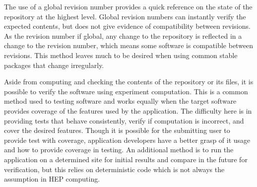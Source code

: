 \documentclass[conference]{IEEEtran}
\begin{document}
The use of a global revision number provides a quick reference
on the state of the repository at the highest level.
Global revision numbers can instantly verify the expected
contents, but does not give evidence of compatibility between
revisions.
As the revision number if global, any change to the repository
is reflected in a change to the revision number, which means 
some software is compatible between revisions.
This method leaves much to be desired when using common stable
packages that change irregularly.

Aside from computing and checking the contents of the
repository or its files, it is possible to verify the
software using experiment computation.
This is a common method used to testing software
and works equally when the target software provides
coverage of the features used by the application.
The difficulty here is in providing tests that
behave consistently, verify if computation is
incorrect, and cover the desired features.
Though it is possible for the submitting user
to provide test with coverage, application
developers have a better grasp of it usage
and how to provide coverage in testing.
An additional method is to run the application
on a determined site for initial results and
compare in the future for verification, but
this relies on deterministic code which is 
not always the assumption in HEP computing.
\end{document}
